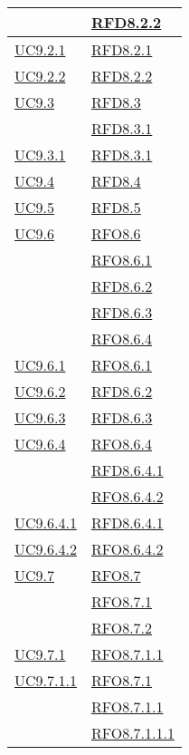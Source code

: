 \begin{longtable}{|>{\centering}m{5cm}|m{5cm}<{\centering}|}
& \hyperlink{RFD8.2.2}{RFD8.2.2}\\ \hline
\hyperref[UC9.2.1]{UC9.2.1} & \hyperlink{RFD8.2.1}{RFD8.2.1}\\ \hline
\hyperref[UC9.2.2]{UC9.2.2} & \hyperlink{RFD8.2.2}{RFD8.2.2}\\ \hline
\hyperref[UC9.3]{UC9.3} & \hyperlink{RFD8.3}{RFD8.3}\\
& \hyperlink{RFD8.3.1}{RFD8.3.1}\\ \hline
\hyperref[UC9.3.1]{UC9.3.1} & \hyperlink{RFD8.3.1}{RFD8.3.1}\\ \hline
\hyperref[UC9.4]{UC9.4} & \hyperlink{RFD8.4}{RFD8.4}\\ \hline
\hyperref[UC9.5]{UC9.5} & \hyperlink{RFD8.5}{RFD8.5}\\ \hline
\hyperref[UC9.6]{UC9.6} & \hyperlink{RFO8.6}{RFO8.6}\\
& \hyperlink{RFO8.6.1}{RFO8.6.1}\\
& \hyperlink{RFD8.6.2}{RFD8.6.2}\\
& \hyperlink{RFD8.6.3}{RFD8.6.3}\\
& \hyperlink{RFO8.6.4}{RFO8.6.4}\\ \hline
\hyperref[UC9.6.1]{UC9.6.1} & \hyperlink{RFO8.6.1}{RFO8.6.1}\\ \hline
\hyperref[UC9.6.2]{UC9.6.2} & \hyperlink{RFD8.6.2}{RFD8.6.2}\\ \hline
\hyperref[UC9.6.3]{UC9.6.3} & \hyperlink{RFD8.6.3}{RFD8.6.3}\\ \hline
\hyperref[UC9.6.4]{UC9.6.4} & \hyperlink{RFO8.6.4}{RFO8.6.4}\\
& \hyperlink{RFD8.6.4.1}{RFD8.6.4.1}\\
& \hyperlink{RFO8.6.4.2}{RFO8.6.4.2}\\ \hline
\hyperref[UC9.6.4.1]{UC9.6.4.1} & \hyperlink{RFD8.6.4.1}{RFD8.6.4.1}\\ \hline
\hyperref[UC9.6.4.2]{UC9.6.4.2} & \hyperlink{RFO8.6.4.2}{RFO8.6.4.2}\\ \hline
\hyperref[UC9.7]{UC9.7} & \hyperlink{RFO8.7}{RFO8.7}\\
& \hyperlink{RFO8.7.1}{RFO8.7.1}\\
& \hyperlink{RFO8.7.2}{RFO8.7.2}\\ \hline
\hyperref[UC9.7.1]{UC9.7.1} & \hyperlink{RFO8.7.1.1}{RFO8.7.1.1}\\ \hline
\hyperref[UC9.7.1.1]{UC9.7.1.1} & \hyperlink{RFO8.7.1}{RFO8.7.1}\\
& \hyperlink{RFO8.7.1.1}{RFO8.7.1.1}\\
& \hyperlink{RFO8.7.1.1.1}{RFO8.7.1.1.1}\\

\end{longtable}
